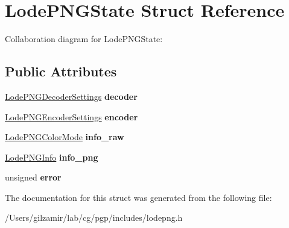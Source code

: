 \hypertarget{struct_lode_p_n_g_state}{}\section{Lode\+P\+N\+G\+State Struct Reference}
\label{struct_lode_p_n_g_state}


Collaboration diagram for Lode\+P\+N\+G\+State\+:
\subsection*{Public Attributes}
\begin{DoxyCompactItemize}
\item 
\mbox{\label{struct_lode_p_n_g_state_abd2c38ffc68f04b0e4159e1f97ba1f76}} 
\mbox{\hyperlink{struct_lode_p_n_g_decoder_settings}{Lode\+P\+N\+G\+Decoder\+Settings}} {\bfseries decoder}
\item 
\mbox{\label{struct_lode_p_n_g_state_ac63d91db835129d02eb83bbe81de347e}} 
\mbox{\hyperlink{struct_lode_p_n_g_encoder_settings}{Lode\+P\+N\+G\+Encoder\+Settings}} {\bfseries encoder}
\item 
\mbox{\label{struct_lode_p_n_g_state_a597bc08de787147474d43adf8b6ceacf}} 
\mbox{\hyperlink{struct_lode_p_n_g_color_mode}{Lode\+P\+N\+G\+Color\+Mode}} {\bfseries info\+\_\+raw}
\item 
\mbox{\label{struct_lode_p_n_g_state_a08d9ac43c995fcf34d72b1d37047b6fa}} 
\mbox{\hyperlink{struct_lode_p_n_g_info}{Lode\+P\+N\+G\+Info}} {\bfseries info\+\_\+png}
\item 
\mbox{\label{struct_lode_p_n_g_state_a1a00a050da588cf3c2b7a6252bebb0cd}} 
unsigned {\bfseries error}
\end{DoxyCompactItemize}


The documentation for this struct was generated from the following file\+:\begin{DoxyCompactItemize}
\item 
/\+Users/gilzamir/lab/cg/pgp/includes/lodepng.\+h\end{DoxyCompactItemize}
